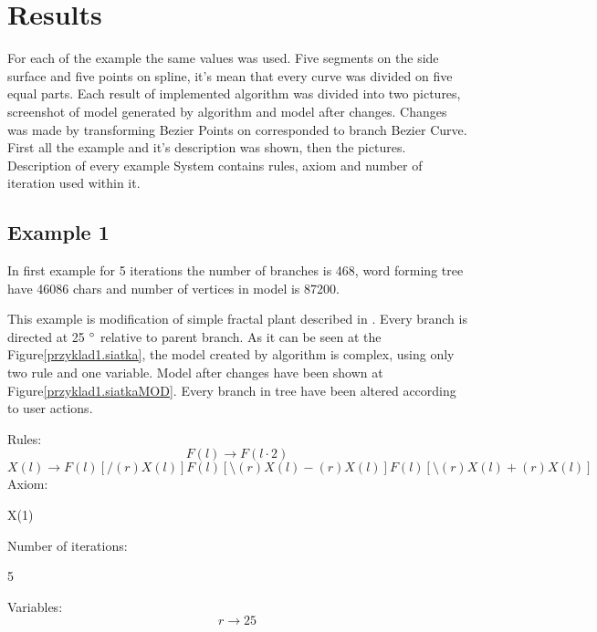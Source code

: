 \documentclass[b5paper,twoside,11pt]{article}
\renewcommand{\figurename}{Figure}
\begin{document}
\section{Results}
For each of the example the same values was used. Five segments on the side surface and five points on spline, it's mean that every curve was divided on five equal parts. Each result of implemented algorithm was divided into two pictures, screenshot of model generated by algorithm and model after changes. Changes was made by transforming Bezier Points on corresponded to branch Bezier Curve. First all the example and it's description was shown, then the pictures. Description of every example System contains rules, axiom and number of iteration used within it.
\subsection*{Example 1}
In first example for 5 iterations the number of branches is 468, word forming tree have 46086 chars and number of vertices in model is 87200.\par
This example is modification of simple fractal plant described in \cite{prusinABOP}.
Every branch is directed at 25  $\degree$ relative to parent branch. As it can be seen at the \figurename \ref{przyklad1.siatka}, the model created by algorithm is complex, using only two rule and one variable. Model after changes have been shown at  \figurename \ref{przyklad1.siatkaMOD}. Every branch in tree have been altered according to user actions.\par 
Rules: \newline
\begin{equation}
F(l)\rightarrow F(l\cdot2) 
\end{equation}
\begin{equation}
X(l) \rightarrow F(l)[/(r)X(l)]F(l)[\setminus(r)X(l)-(r)X(l)]F(l)[\setminus(r)X(l)+(r)X(l)] 
\end{equation}
Axiom:
\begin{center}
X(1)
\end{center}
Number of iterations:
\begin{center}
5
\end{center}
Variables:
\begin{equation}
r\rightarrow 25
\end{equation}
\end{document}
